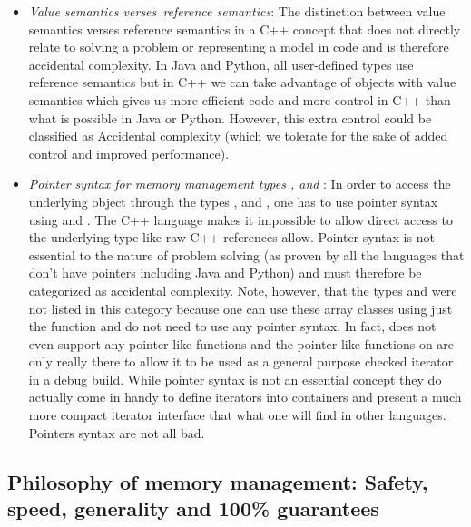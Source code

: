 \documentclass[pdf,ps2pdf,11pt]{SANDreport}
\begin{document}
\begin{itemize}

{}\item\textit{Value semantics verses\ reference semantics}: The
distinction between value semantics verses reference semantics in a
C++ concept that does not directly relate to solving a problem or
representing a model in code and is therefore accidental complexity.
In Java and Python, all user-defined types use reference semantics but
in C++ we can take advantage of objects with value semantics which
gives us more efficient code and more control in C++ than what is
possible in Java or Python.  However, this extra control could be
classified as Accidental complexity (which we tolerate for the sake
of added control and improved performance).

{}\item\textit{Pointer syntax for memory management types {},
and {}}: In order to access the underlying object through the
types {}, and {}, one has to use pointer syntax
using {} and {}.  The C++ language makes
it impossible to allow direct access to the underlying type like raw
C++ references allow.  Pointer syntax is not essential to the nature
of problem solving (as proven by all the languages that don't have
pointers including Java and Python) and must therefore be categorized
as accidental complexity.  Note, however, that the types
{} and {} were not listed in this
category because one can use these array classes using just the
{} function and do not need to use any
pointer syntax.  In fact, {} does not even support any
pointer-like functions and the pointer-like functions on
{} are only really there to allow it to be used as a
general purpose checked iterator in a debug build.  While pointer
syntax is not an essential concept they do actually come in handy to
define iterators into containers and present a much more compact
iterator interface that what one will find in other languages.
Pointers syntax are not all bad.

\end{itemize}


%
{}\subsection{Philosophy of memory management: Safety, speed,
generality and 100\% guarantees}
\label{sec:phylosophy-of-mem-mng}
%
\end{document}

